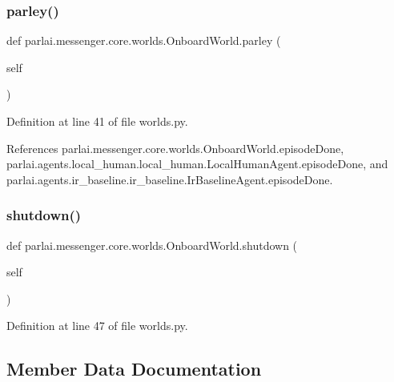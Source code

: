 \subsubsection{\texorpdfstring{parley()}{parley()}}
{\footnotesize\ttfamily def parlai.\+messenger.\+core.\+worlds.\+Onboard\+World.\+parley (\begin{DoxyParamCaption}\item[{}]{self }\end{DoxyParamCaption})}



Definition at line 41 of file worlds.\+py.



References parlai.\+messenger.\+core.\+worlds.\+Onboard\+World.\+episode\+Done, parlai.\+agents.\+local\+\_\+human.\+local\+\_\+human.\+Local\+Human\+Agent.\+episode\+Done, and parlai.\+agents.\+ir\+\_\+baseline.\+ir\+\_\+baseline.\+Ir\+Baseline\+Agent.\+episode\+Done.

\mbox{\label{classparlai_1_1messenger_1_1core_1_1worlds_1_1OnboardWorld_a241f259d163104f3a903b5366d6bd432}} 
\subsubsection{\texorpdfstring{shutdown()}{shutdown()}}
{\footnotesize\ttfamily def parlai.\+messenger.\+core.\+worlds.\+Onboard\+World.\+shutdown (\begin{DoxyParamCaption}\item[{}]{self }\end{DoxyParamCaption})}



Definition at line 47 of file worlds.\+py.



\subsection{Member Data Documentation}
\mbox{\label{classparlai_1_1messenger_1_1core_1_1worlds_1_1OnboardWorld_ace2a51f42d513a5e8224c7b24406fc41}} 
